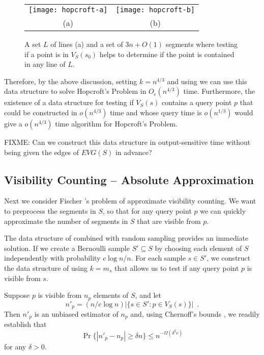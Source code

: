 \documentclass{patmorin}
\newcommand{\EVG}{\mathit{EVG}}
\newcommand{\Oe}{O_\epsilon}
\begin{document}
\begin{figure}
  \begin{center}
    \begin{tabular}{cc}
      \texttt{[image: hopcroft-a]} &
      \texttt{[image: hopcroft-b]} \\
      (a) & (b)
    \end{tabular}
  \end{center}
  \caption{A set $L$ of lines (a) and a set of $3n+O(1)$ segments where
           testing if a point is in $V_S(s_0)$ helps to determine if
           the point is contained in any line of $L$.}
\end{figure}

Therefore, by the above discussion, setting $k=n^{4/3}$ and using
 we can use this data structure to solve Hopcroft's
Problem in $\Oe(n^{4/3})$ time.  Furthermore, the existence of a data
structure for testing if $V_S(s)$ contains a query point $p$ that could be
constructed in $o(n^{4/3})$ time and whose query time is $o(n^{1/3})$ would
give a $o(n^{4/3})$ time algorithm for Hopcroft's Problem.

FIXME: Can we construct this data structure in output-sensitive time
without being given the edges of $\EVG(S)$ in advance?

\subsection{Visibility Counting -- Absolute Approximation}

Next we consider Fischer \etal's problem of approximate visibility
counting.  We want to preprocess the segments in $S$, so that for any
query point $p$ we can quickly approximate the number of segments in $S$
that are visible from $p$.

The data structure of  combined with random
sampling provides an immediate solution.  If we create a Bernoulli
sample $S'\subseteq S$ by choosing each element of $S$ independently
with probability $c\log n/n$.  For each sample $s\in S'$, we construct
the data structure of  using $k=m_s$ that allows us
to test if any query point $p$ is visible from $s$.

Suppose $p$ is visible from $n_p$ elements of $S$, and let 
\[
   n'_p= (n/c\log n)|\{s\in S': p\in V_S(s)\}| \enspace .
\]
Then $n'_p$ is an unbiased estimator of $n_p$ and, using Chernoff's bounds
\cite{X}, we readily establish that
\[
   \Pr\{|n'_p - n_p| \ge \delta n\} \le n^{-\Omega(\delta^2 c)}
\]
for any $\delta > 0$.
\end{document}
